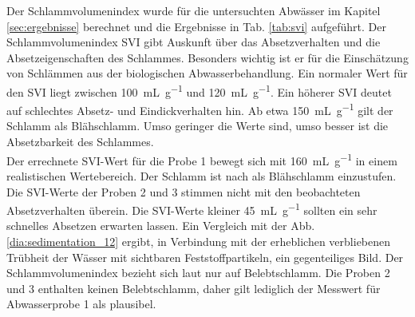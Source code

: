 





Der Schlammvolumenindex wurde für die untersuchten Abwässer im Kapitel \ref{sec:ergebnisse} berechnet und die Ergebnisse in Tab. \ref{tab:svi} aufgeführt.
Der Schlammvolumenindex SVI gibt Auskunft über das Absetzverhalten und die Absetzeigenschaften des Schlammes. Besonders wichtig ist er für die Einschätzung von Schlämmen aus der biologischen Abwasserbehandlung. 
Ein normaler Wert für den SVI liegt zwischen \SI{100}{\milli\liter\per\gram} und \SI{120}{\milli\liter\per\gram}. Ein höherer SVI deutet auf schlechtes Absetz- und Eindickverhalten hin. Ab etwa \SI{150}{\milli\liter\per\gram} gilt der Schlamm als Blähschlamm. Umso geringer die Werte sind, umso besser ist die Absetzbarkeit des Schlammes.\cite{Dr.ManfredNeupert.August2008}\\
Der errechnete SVI-Wert für die Probe 1 bewegt sich mit \SI{160}{\milli\liter\per\gram} in einem realistischen Wertebereich. Der Schlamm ist nach \cite{Dr.ManfredNeupert.August2008} als Blähschlamm einzustufen. Die SVI-Werte der Proben 2 und 3 stimmen nicht mit den beobachteten Absetzverhalten überein. Die SVI-Werte kleiner \SI{45}{\milli\liter\per\gram} sollten ein sehr schnelles Absetzen erwarten lassen. Ein Vergleich mit der Abb. \ref{dia:sedimentation_12} ergibt, in Verbindung mit der erheblichen verbliebenen Trübheit der Wässer mit sichtbaren Feststoffpartikeln, ein gegenteiliges Bild. Der Schlammvolumenindex bezieht sich laut \cite{Dr.ManfredNeupert.August2008} nur auf Belebtschlamm. Die Proben 2 und 3 enthalten keinen Belebtschlamm, daher gilt lediglich der Messwert für Abwasserprobe 1 als plausibel. \\




